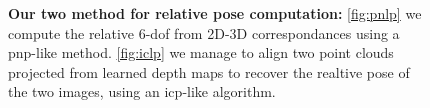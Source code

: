 \begin{figure}
	\centering
	
    \begin{minipage}{0.5\linewidth}
    \end{minipage}\hfill
	\begin{minipage}{0.5\linewidth}
	\end{minipage}
	
	\caption[Relative pose computation methods]{\textbf{Our two method for relative pose computation:} \ref{fig:pnlp} we compute the relative 6-\ac{dof} from 2D-3D correspondances using a \ac{pnp}-like method. \ref{fig:iclp} we manage to align two point clouds projected from learned depth maps to recover the realtive pose of the two images, using an \ac{icp}-like algorithm.\label{fig:relative_pose}}
\end{figure}
